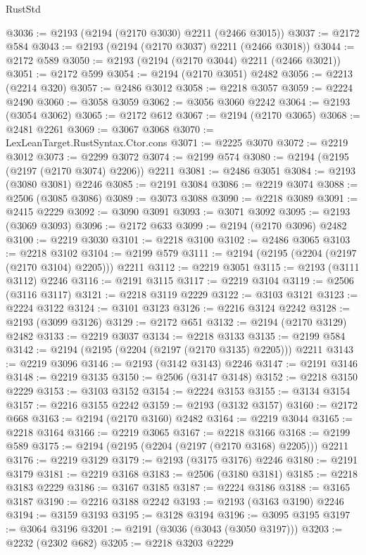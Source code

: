 \begin{lexlean}{RustStd}
\begin{coremodule}
{\begin{coremodule}
{{{{{{{{{{{{{{{{{{{{{{{{{{@3036 := @2193 (@2194 (@2170 @3030) @2211 (@2466 @3015))
@3037 := @2172 @584
@3043 := @2193 (@2194 (@2170 @3037) @2211 (@2466 @3018))
@3044 := @2172 @589
@3050 := @2193 (@2194 (@2170 @3044) @2211 (@2466 @3021))
@3051 := @2172 @599
@3054 := @2194 (@2170 @3051) @2482
@3056 := @2213 (@2214 @320)
@3057 := @2486 @3012
@3058 := @2218 @3057
@3059 := @2224 @2490
@3060 := @3058 @3059
@3062 := @3056 @3060 @2242
@3064 := @2193 (@3054 @3062)
@3065 := @2172 @612
@3067 := @2194 (@2170 @3065)
@3068 := @2481 @2261
@3069 := @3067 @3068
@3070 := LexLeanTarget.RustSyntax.Ctor.cons
@3071 := @2225 @3070
@3072 := @2219 @3012
@3073 := @2299 @3072
@3074 := @2199 @574
@3080 := @2194 (@2195 (@2197 (@2170 @3074) @2206)) @2211
@3081 := @2486 @3051
@3084 := @2193 (@3080 @3081) @2246
@3085 := @2191 @3084
@3086 := @2219 @3074
@3088 := @2506 (@3085 @3086)
@3089 := @3073 @3088
@3090 := @2218 @3089
@3091 := @2415 @2229
@3092 := @3090 @3091
@3093 := @3071 @3092
@3095 := @2193 (@3069 @3093)
@3096 := @2172 @633
@3099 := @2194 (@2170 @3096) @2482
@3100 := @2219 @3030
@3101 := @2218 @3100
@3102 := @2486 @3065
@3103 := @2218 @3102
@3104 := @2199 @579
@3111 := @2194 (@2195 (@2204 (@2197 (@2170 @3104) @2205))) @2211
@3112 := @2219 @3051
@3115 := @2193 (@3111 @3112) @2246
@3116 := @2191 @3115
@3117 := @2219 @3104
@3119 := @2506 (@3116 @3117)
@3121 := @2218 @3119 @2229
@3122 := @3103 @3121
@3123 := @2224 @3122
@3124 := @3101 @3123
@3126 := @2216 @3124 @2242
@3128 := @2193 (@3099 @3126)
@3129 := @2172 @651
@3132 := @2194 (@2170 @3129) @2482
@3133 := @2219 @3037
@3134 := @2218 @3133
@3135 := @2199 @584
@3142 := @2194 (@2195 (@2204 (@2197 (@2170 @3135) @2205))) @2211
@3143 := @2219 @3096
@3146 := @2193 (@3142 @3143) @2246
@3147 := @2191 @3146
@3148 := @2219 @3135
@3150 := @2506 (@3147 @3148)
@3152 := @2218 @3150 @2229
@3153 := @3103 @3152
@3154 := @2224 @3153
@3155 := @3134 @3154
@3157 := @2216 @3155 @2242
@3159 := @2193 (@3132 @3157)
@3160 := @2172 @668
@3163 := @2194 (@2170 @3160) @2482
@3164 := @2219 @3044
@3165 := @2218 @3164
@3166 := @2219 @3065
@3167 := @2218 @3166
@3168 := @2199 @589
@3175 := @2194 (@2195 (@2204 (@2197 (@2170 @3168) @2205))) @2211
@3176 := @2219 @3129
@3179 := @2193 (@3175 @3176) @2246
@3180 := @2191 @3179
@3181 := @2219 @3168
@3183 := @2506 (@3180 @3181)
@3185 := @2218 @3183 @2229
@3186 := @3167 @3185
@3187 := @2224 @3186
@3188 := @3165 @3187
@3190 := @2216 @3188 @2242
@3193 := @2193 (@3163 @3190) @2246
@3194 := @3159 @3193
@3195 := @3128 @3194
@3196 := @3095 @3195
@3197 := @3064 @3196
@3201 := @2191 (@3036 (@3043 (@3050 @3197)))
@3203 := @2232 (@2302 @682)
@3205 := @2218 @3203 @2229
}}}}}}}}}}}}}}}}}}}}}}}}}}
\end{coremodule}}
\end{coremodule}
\end{lexlean}
